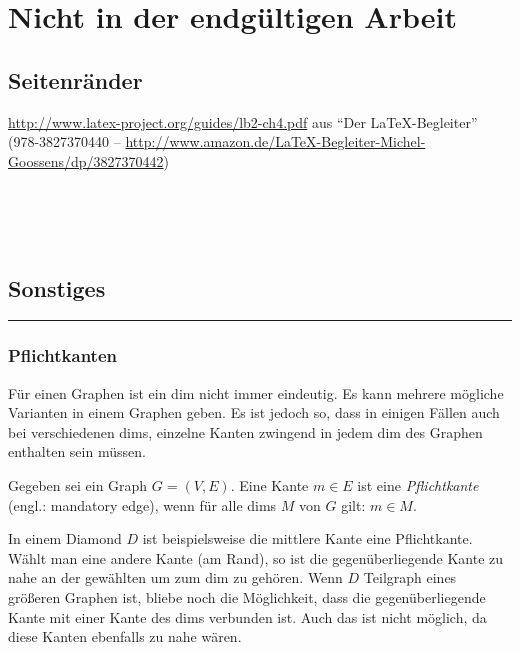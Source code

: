 \part{Nicht in der endgültigen Arbeit}

\chapter{Seitenränder}
\url{http://www.latex-project.org/guides/lb2-ch4.pdf}  aus "`Der \LaTeX-Begleiter"' (978-3827370440 -- \url{http://www.amazon.de/LaTeX-Begleiter-Michel-Goossens/dp/3827370442})

\the\oddsidemargin \\
\the\evensidemargin \\
\the\hoffset \\
\the\footskip


\chapter{Sonstiges}


\cite{brandstaedt1999graph}
\cite{Cardoso2011}
\cite{ClWidthSOL}
\rule{\linewidth}{1pt}
\clearpage

\section{Pflichtkanten}

Für einen Graphen ist ein dim nicht immer eindeutig. Es kann mehrere mögliche Varianten in einem Graphen geben. Es ist jedoch so, dass in einigen Fällen auch bei verschiedenen dims, einzelne Kanten zwingend in jedem dim des Graphen enthalten sein müssen.

\begin{mydef}[Pflichtkante]
Gegeben sei ein Graph $G=(V,E)$. Eine Kante $m\in E$ ist eine \emph{Pflichtkante} (engl.: mandatory edge), wenn für alle dims $M$ von $G$ gilt: $m\in M$.
\end{mydef}

In einem Diamond $D$ ist beispielsweise die mittlere Kante eine Pflichtkante. Wählt man eine andere Kante (am Rand), so ist die gegenüberliegende Kante zu nahe an der gewählten um zum dim zu gehören. Wenn $D$ Teilgraph eines größeren Graphen ist, bliebe noch die Möglichkeit, dass die gegenüberliegende Kante mit einer Kante des dims verbunden ist. Auch das ist nicht möglich, da diese Kanten ebenfalls zu nahe wären.

